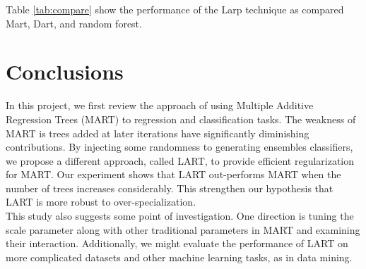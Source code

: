 \documentclass{article} %
\begin{document}
Table \ref{tab:compare} show the performance of the Larp technique as compared Mart, Dart, and random forest.

\section{Conclusions}
In this project, we first review the approach of using Multiple Additive Regression Trees (MART) to regression and classification tasks. The weakness of MART is trees added at later iterations have significantly diminishing contributions. By injecting some randomness to generating ensembles classifiers, we propose a different approach, called LART, to provide efficient regularization for MART. Our experiment shows that LART out-performs MART when the number of trees increases considerably. This strengthen our hypothesis that LART is more robust to over-specialization.\\

This study also suggests some point of investigation. One direction is tuning the scale parameter along with other traditional parameters in MART and examining their interaction. Additionally, we might evaluate the performance of LART on more complicated datasets and other machine learning tasks, as in data mining.



\nocite{*}


\end{document}
